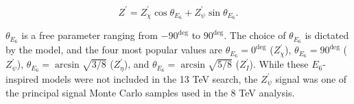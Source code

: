 \begin{equation}
Z^{\prime} = Z^\prime_\chi \cos{\theta_{E_6}} + Z^\prime_\psi \sin{\theta_{E_6}}.
\end{equation}

$\theta_{E_6}$ is a free parameter ranging from $-90^{\deg}$ to $90^{\deg}$. The choice of $\theta_{E_6}$ is dictated by the model, and the four most popular values are $\theta_{E_6} = 0^{\deg}$ ($Z^\prime_\chi$), $\theta_{E_6} = 90^{\deg}$ ($Z^\prime_\psi$), $\theta_{E_6} = \arcsin{\sqrt{3/8}}$ ($Z^\prime_\eta$), and $\theta_{E_6} = \arcsin{\sqrt{5/8}}$ ($Z^\prime_I$).\cite{E6} While these $E_6$-inspired models were not included in the 13 TeV search, the $Z^\prime_\psi$ signal was one of the principal signal Monte Carlo samples used in the 8 TeV analysis.